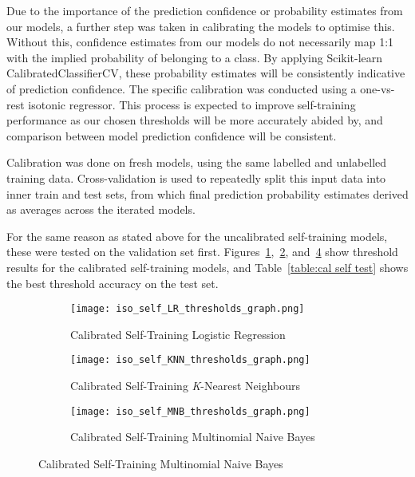 \documentclass[11pt]{article}
\begin{document}
\vspace{3mm}
Due to the importance of the prediction confidence or probability estimates from our models, 
a further step was taken in calibrating the models to optimise this. 
Without this, confidence estimates from our models do not necessarily map 1:1 with 
the implied probability of belonging to a class. By applying Scikit-learn CalibratedClassifierCV, 
these probability estimates will be consistently indicative of prediction confidence. 
The specific calibration was conducted using a one-vs-rest isotonic regressor.
This process is expected to improve self-training performance as our chosen thresholds will be more 
accurately abided by, and comparison between model prediction confidence will be consistent. 

Calibration was done on fresh models, using the same labelled and unlabelled training data. 
Cross-validation is used to repeatedly split this input data into inner train and test sets, 
from which final prediction probability estimates derived as averages across the iterated models. 

For the same reason as stated above for the uncalibrated self-training models, these were tested on the validation set first.
Figures~\ref{fig:cal self LR},~\ref{fig:cal self KNN}, and~\ref{fig:cal self MNB} show threshold results for the calibrated self-training models, and 
Table~\ref{table:cal self test} shows the best threshold accuracy on the test set.

\begin{figure}[h]
\caption{Calibrated Self-Training Models}
\begin{subfigure}{0.5\textwidth}
	\texttt{[image: iso\_self\_LR\_thresholds\_graph.png]}
	\caption{Calibrated Self-Training Logistic Regression}
	\label{fig:cal self LR}
	\centering
\end{subfigure}	
\begin{subfigure}{0.5\textwidth}
	\texttt{[image: iso\_self\_KNN\_thresholds\_graph.png]}
	\caption{Calibrated Self-Training \textit{K}-Nearest Neighbours}
	\label{fig:cal self KNN}
	\centering
\end{subfigure}
\begin{subfigure}{0.5\textwidth}
	\texttt{[image: iso\_self\_MNB\_thresholds\_graph.png]}
	\caption{Calibrated Self-Training Multinomial Naive Bayes}
	\label{fig:cal self MNB}
	\centering
\end{subfigure}

\end{figure}
\end{document}

